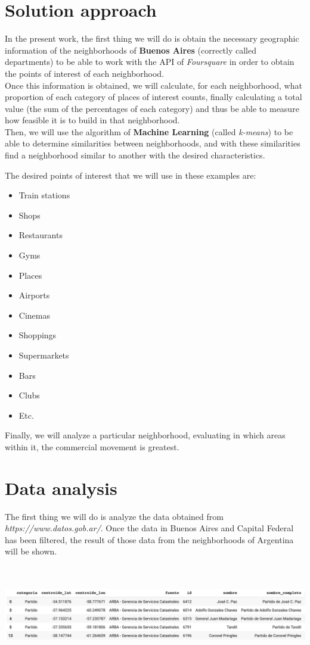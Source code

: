 \documentclass[12pt,a4paper]{tesis}
\begin{document}
\chapter{Solution approach}
In the present work, the first thing we will do is obtain the necessary geographic information of the neighborhoods of \textbf{Buenos Aires} (correctly called departments) to be able to work with the API of \textit{Foursquare} in order to obtain the points of interest of each neighborhood. \\
Once this information is obtained, we will calculate, for each neighborhood, what proportion of each category of places of interest counts, finally calculating a total value (the sum of the percentages of each category) and thus be able to measure how feasible it is to build in that neighborhood. \\

Then, we will use the algorithm of \textbf{Machine Learning} (called \textit{k-means}) to be able to determine similarities between neighborhoods, and with these similarities find a neighborhood similar to another with the desired characteristics.

The desired points of interest that we will use in these examples are:

\begin{itemize}
\item Train stations
\item Shops
\item Restaurants
\item Gyms
\item Places
\item Airports
\item Cinemas
\item Shoppings
\item Supermarkets
\item Bars
\item Clubs
\item Etc.
\end{itemize}




Finally, we will analyze a particular neighborhood, evaluating in which areas within it, the commercial movement is greatest.

\chapter{Data analysis}
The first thing we will do is analyze the data obtained from \textit{https://www.datos.gob.ar/}. Once the data in Buenos Aires and Capital Federal has been filtered, the result of those data from the neighborhoods of Argentina will be shown. \\
\\
\\
\centerline{
	\includegraphics[scale=0.36]{tabla1}
}
\\
\\
\end{document}
